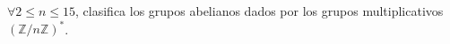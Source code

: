 \question
$\forall 2 \le n \le 15$, clasifica los grupos abelianos dados por 
los grupos multiplicativos $(\mathbb{Z}/n\mathbb{Z})^*$.